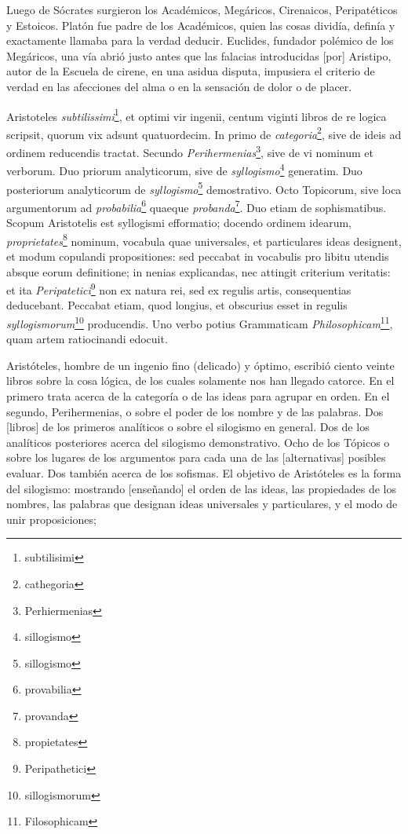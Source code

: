 \message{ !name(tractatus.tex)}\documentclass{article}
\begin{document}
\begin{paracol}{2}
\begin{nthcolumn*}{0}
\end{nthcolumn*}
\vspace{0.5cm}
\begin{nthcolumn}{1} %
Luego de Sócrates surgieron los Académicos, Megáricos, Cirenaicos, Peripatéticos y Estoicos. Platón fue padre de los Académicos, quien las cosas dividía, definía y exactamente llamaba para la verdad deducir. Euclides, fundador polémico de los Megáricos, una vía abrió justo antes que las falacias introducidas [por] Aristipo, autor de la Escuela de cirene, en una asidua disputa, impusiera el criterio de verdad en las afecciones del alma o en la sensación de dolor o de placer.
\end{nthcolumn}
\vspace{0.5cm}
\begin{nthcolumn*}{0} %
Aristoteles \emph{subtilissimi}\footnote{subtilisimi}, et optimi vir ingenii, centum viginti libros de re logica scripsit, quorum vix adsunt quatuordecim. In primo de \emph{categoria}\footnote{cathegoria}, sive de ideis ad ordinem reducendis tractat. Secundo \emph{Perihermenias}\footnote{Perhiermenias}, sive de vi nominum et verborum. Duo priorum analyticorum, sive de \emph{syllogismo}\footnote{sillogismo} generatim. Duo posteriorum analyticorum de \emph{syllogismo}\footnote{sillogismo} demostrativo. Octo Topicorum, sive loca argumentorum ad \emph{probabilia}\footnote{provabilia} quaeque \emph{probanda}\footnote{provanda}. Duo etiam de sophismatibus. Scopum Aristotelis est syllogismi efformatio; docendo ordinem idearum, \emph{proprietates}\footnote{propietates} nominum, vocabula quae universales, et particulares ideas designent, et modum copulandi propositiones: sed peccabat in vocabulis pro libitu utendis absque eorum definitione; in nenias explicandas, nec attingit criterium veritatis: et ita \emph{Peripatetici}\footnote{Peripathetici} non ex natura rei, sed ex regulis artis, consequentias deducebant. Peccabat etiam, quod longius, et obscurius esset in regulis \emph{syllogismorum}\footnote{sillogismorum} producendis. Uno verbo potius Grammaticam \emph{Philosophicam}\footnote{Filosophicam}, quam artem ratiocinandi edocuit.
\end{nthcolumn*}
\vspace{0.5cm}
\begin{nthcolumn}{1} %
Aristóteles, hombre de un ingenio fino (delicado) y óptimo, escribió ciento veinte libros sobre la cosa lógica, de los cuales solamente nos han llegado catorce. En el primero trata acerca de la categoría o de las ideas para agrupar en orden. En el segundo, Perihermenias, o sobre el poder de los nombre y de las palabras. Dos [libros] de los primeros analíticos o sobre el silogismo en general. Dos de los analíticos posteriores acerca del silogismo demonstrativo. Ocho de los Tópicos o sobre los lugares de los argumentos para cada una de las [alternativas] posibles evaluar. Dos también acerca de los sofismas. El objetivo de Aristóteles es la forma del silogismo: mostrando [enseñando] el orden de las ideas, las propiedades de los nombres, las palabras que designan ideas universales y particulares, y el modo de unir proposiciones; 

\end{nthcolumn}
\end{paracol}
\end{document}
